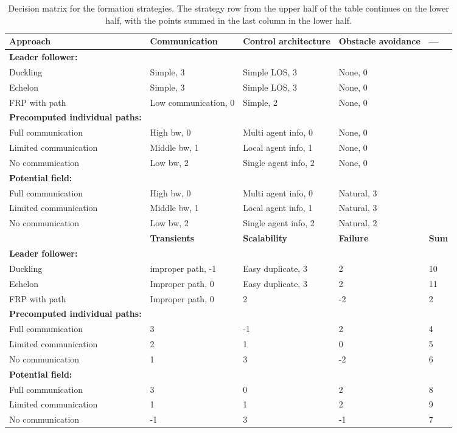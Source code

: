 \begin{sidewaystable}
\begin{tabular}{l|lll|l}
\toprule
\textbf{Approach} & \textbf{Communication} & \textbf{Control architecture} & \textbf{Obstacle avoidance} & ---\\
\hline
\textbf{Leader follower:}&&&& \\
Duckling & Simple, 3 & Simple LOS, 3 & None, 0 & \\
Echelon & Simple, 3 & Simple LOS, 3 & None, 0 & \\
\ac{FRP} with path& Low communication, 0 & Simple, 2 & None, 0 & \\
\textbf{Precomputed individual paths:}&&&& \\
Full communication& High bw, 0 & Multi agent info, 0 & None, 0 & \\
Limited communication& Middle bw, 1 & Local agent info, 1 & None, 0 & \\
No communication& Low bw, 2 & Single agent info, 2 & None, 0 & \\
\textbf{Potential field:}&&&& \\
Full communication& High bw, 0 & Multi agent info, 0 & Natural, 3 & \\
Limited communication& Middle bw, 1 & Local agent info, 1 & Natural, 3 & \\
No communication& Low bw, 2 & Single agent info, 2 & Natural, 2& \\
\bottomrule
 & \textbf{Transients} & \textbf{Scalability} & \textbf{Failure}& \textbf{Sum}\\
\hline
\textbf{Leader follower:}&&&& \\
Duckling  & improper path, -1 & Easy duplicate, 3 & 2 & 10\\
Echelon  & Improper path, 0 & Easy duplicate, 3 & 2 & 11\\
\ac{FRP} with path   & Improper path, 0 & 2 & -2 & 2\\
\textbf{Precomputed individual paths:}&&&& \\
Full communication   & 3 & -1 & 2 & 4\\
Limited communication  & 2 & 1 & 0 & 5\\
No communication   & 1 & 3 & -2 & 6\\
\textbf{Potential field:}&&&& \\
Full communication  & 3 & 0 & 2 & 8\\
Limited communication  & 1 & 1 & 2 & 9\\
No communication  & -1 & 3 & -1 &7\\
\bottomrule
\end{tabular}
\caption{Decision matrix for the formation strategies. The strategy row from the upper half of the table continues on the lower half, with the points summed in the last column in the lower half.}
\label{tab:decision-matrix}
\end{sidewaystable}


